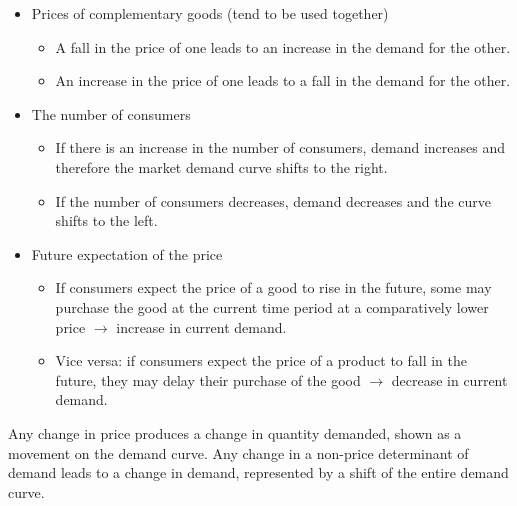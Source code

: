 \begin{itemize}
\begin{itemize}
    \item An increase in the price of one results in an increase in the demand for the other. (switching products)
  \end{itemize}
  \item Prices of complementary goods (tend to be used together)
  \begin{itemize}
    \item A fall in the price of one leads to an increase in the demand for the other.
    \item An increase in the price of one leads to a fall in the demand for the other.
  \end{itemize}
  \item The number of consumers
  \begin{itemize}
    \item If there is an increase in the number of consumers, demand increases and therefore the market demand curve shifts to the right.
    \item If the number of consumers decreases, demand decreases and the curve shifts to the left.
  \end{itemize}
  \item Future expectation of the price
	\begin{itemize}
\item If consumers expect the price of a good to rise in the future, some may purchase the good at the current time period at a comparatively lower price $\rightarrow$ increase in current demand.
\item Vice versa: if consumers expect the price of a product to fall in the future, they may delay their purchase of the good $\rightarrow$ decrease in current demand.
\end{itemize}
\end{itemize}
Any change in price produces a change in quantity demanded, shown as a movement on the demand curve. Any change in a non-price determinant
of demand leads to a change in demand, represented by a shift of the entire demand curve.
